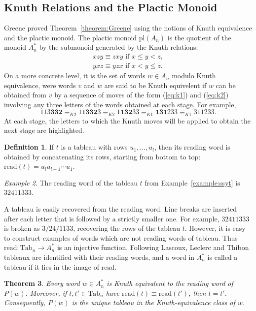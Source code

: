 \documentclass[10pt]{amsproc}
\newtheorem{theorem}{Theorem}[subsection]
\theoremstyle{definition}
\newtheorem{definition}[theorem]{Definition}
\theoremstyle{remark}
\newtheorem{example}[theorem]{Example}
\newcommand{\Tab}{\mathrm{Tab}}
\newcommand{\rc}[1]{\mathbf{#1}}
\newcommand{\rd}{\mathrm{read}}
\newcommand{\pl}{\mathrm{pl}}
\begin{document}
\subsection{Knuth Relations and the Plactic Monoid}
\label{sec:knuth-equivalence}
Greene \cite{Greene-schen} proved Theorem~\ref{theorem:Greene} using the notions of Knuth equivalence and the plactic monoid.
The plactic monoid $\pl(A_n)$ is the quotient of the monoid $A_n^*$ by the submonoid generated by the Knuth relations:
\begin{gather}
  \tag{$K1$}\label{eq:k1}
  xzy \equiv zxy \text{ if } x\leq y < z,
  \\
  \tag{$K2$}\label{eq:k2}
  yxz \equiv yzx \text{ if } x < y \leq z.
\end{gather}
On a more concrete level, it is the set of words $w\in A_n$ modulo Knuth equivalence, were words $v$ and $w$ are said to be Knuth equivelent if $w$ can be obtained from $v$ by a sequence of moves of the form (\ref{eq:k1}) and (\ref{eq:k2}) involving any three letters of the words obtained at each stage.
For example,
\begin{displaymath}
  113\rc{332}\equiv_{K2} 11\rc{332}3\equiv_{K2} 1\rc{132}33 \equiv_{K1} \rc{131}233 \equiv_{K1} 311233.
\end{displaymath}
At each stage, the letters to which the Knuth moves will be applied to obtain the next stage are highlighted.
\begin{definition}
  If $t$ is a tableau with rows $u_1,\dotsc,u_l$, then its reading word is obtained by concatenating its rows, starting from bottom to top: $\rd(t) = u_lu_{l-1}\dotsb u_1$.
\end{definition}
\begin{example}
  The reading word of the tableau $t$ from Example~\ref{example:ssyt} is $32411333$.
\end{example}
A tableau is easily recovered from the reading word.
Line breaks are inserted after each letter that is followed by a strictly smaller one.
For example, $32411333$ is broken as $3/24/1133$, recovering the rows of the tableau $t$.
However, it is easy to construct examples of words which are not reading words of tableau.
Thus $\rd:\Tab_n\to A_n^*$ is an injective function.
Following Lascoux, Leclerc and Thibon \cite{Lascoux} tableaux are identified with their reading words, and a word in $A_n^*$ is called a tableau if it lies in the image of $\rd$.
\begin{theorem}
  \label{theorem:unique-tab}
  Every word $w\in A_n^*$ is Knuth equivalent to the reading word of $P(w)$.
  Moreover, if $t,t'\in \Tab_n$ have $\rd(t)\equiv \rd(t')$, then $t=t'$.
  Consequently, $P(w)$ is the unique tableau in the Knuth-equivalence class of $w$.
\end{theorem}
\end{document}
